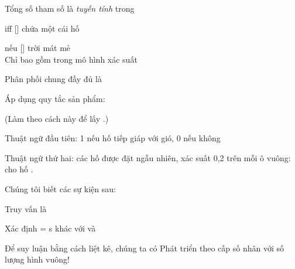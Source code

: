 \documentclass{article}
\begin{document}
\begin{huge}
\vspace*{0.3in}

\textwidth
{}

Tổng số tham số là \emph{tuyến tính} trong 


\textwidth
{}

 iff [] chứa một cái hố

 nếu [] trời mát mẻ\\
Chỉ bao gồm  trong mô hình xác suất


Phân phối chung đầy đủ là 

Áp dụng quy tắc sản phẩm: 

(Làm theo cách này để lấy .)

Thuật ngữ đầu tiên: 1 nếu hố tiếp giáp với gió, 0 nếu không

Thuật ngữ thứ hai: các hố được đặt ngẫu nhiên, xác suất 0,2 trên mỗi ô vuông:
\mat{\[
   \pv(P_{1,1},\ldots,P_{4,4}) = \myprod_{i,j\eq 1,1}^{4,4} \pv(P_{i,j}) = 0.2^n \stimes 0.8^{16-n}
\]}
cho hố .


Chúng tôi biết các sự kiện sau:\al
{}\al
{}

Truy vấn là 

Xác định  = s khác với  và 

Để suy luận bằng cách liệt kê, chúng ta có
\mat{\[
  \pv(P_{1,3}|known,b) = \alpha \mysum_{unknown}\pv(P_{1,3},unknown,known,b)  
\]}
Phát triển theo cấp số nhân với số lượng hình vuông!



\end{huge}
\end{document}
